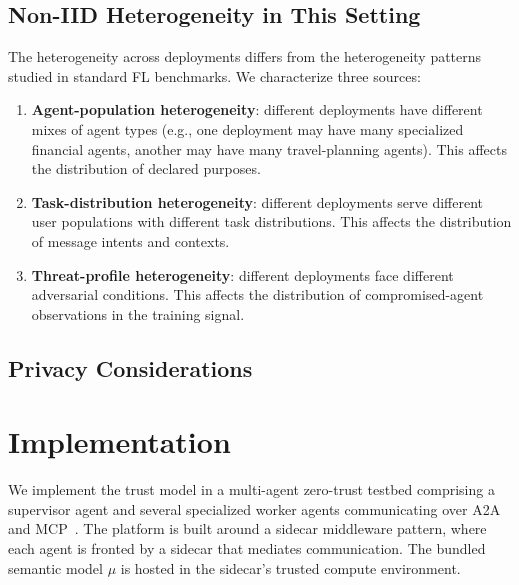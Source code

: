 \documentclass[sigconf,nonacm]{acmart}
\begin{document}
\subsection{Non-IID Heterogeneity in This Setting}

The heterogeneity across deployments differs from the heterogeneity patterns studied in standard FL benchmarks. We characterize three sources:
\begin{enumerate}
    \item \textbf{Agent-population heterogeneity}: different deployments have different mixes of agent types (e.g., one deployment may have many specialized financial agents, another may have many travel-planning agents). This affects the distribution of declared purposes.
    \item \textbf{Task-distribution heterogeneity}: different deployments serve different user populations with different task distributions. This affects the distribution of message intents and contexts.
    \item \textbf{Threat-profile heterogeneity}: different deployments face different adversarial conditions. This affects the distribution of compromised-agent observations in the training signal.
\end{enumerate}


\subsection{Privacy Considerations}


\section{Implementation}
\label{sec:impl}


We implement the trust model in a multi-agent zero-trust testbed comprising a supervisor agent and several specialized worker agents communicating over A2A~\cite{REF:a2a} and MCP~\cite{REF:mcp}. The platform is built around a sidecar middleware pattern, where each agent is fronted by a sidecar that mediates communication. The bundled semantic model $\mu$ is hosted in the sidecar's trusted compute environment.
\end{document}
